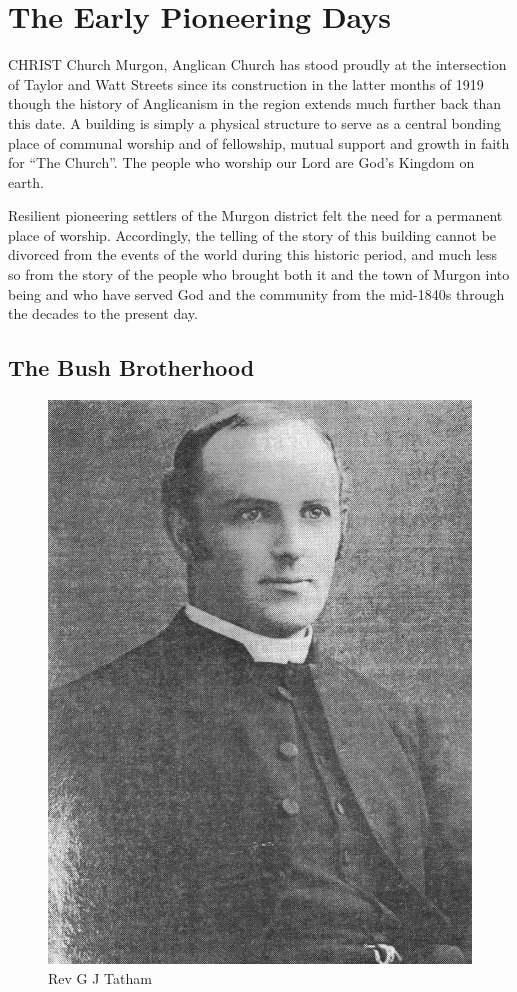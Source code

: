 

\chapter{The Early Pioneering Days}
\nobalance


\lettrine[lines=3]{C}{HRIST}
 Church Murgon, Anglican Church has stood proudly at the intersection of Taylor and Watt Streets since its construction in the latter months of 1919 though the history of Anglicanism in the region extends much further back than this date. A building is simply a physical structure to serve as a central bonding place of communal worship and of fellowship, mutual support and growth in faith for ``The Church''. The people who worship our Lord are God's Kingdom on earth.

Resilient pioneering settlers of the Murgon district felt the need for a permanent place of worship. Accordingly, the telling of the story of this building cannot be divorced from the events of the world during this historic period, and much less so from the story of the people who brought both it and the town of Murgon into being and who have served God and the community from the mid-1840s through the decades to the present day.



\section{The Bush Brotherhood}









\begin{figure}
\begin{center}
\includegraphics[width=.5\linewidth,center]{../images/RGTatham.jpg}
\caption{Rev G J Tatham}
\end{center}
\end{figure}




